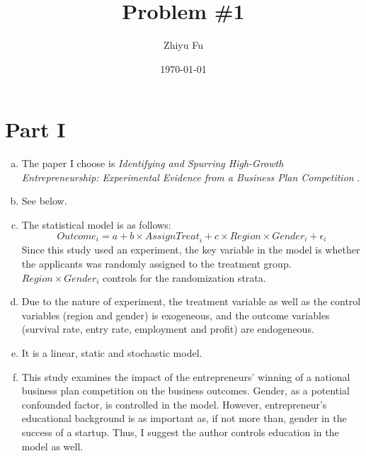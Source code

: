 \documentclass[12pt]{article}%
\begin{document}
\title{Problem \#1}
\author{Zhiyu Fu}
\date{\today}
\maketitle
\section{Part I}
\begin{enumerate}[a)]
	\item The paper I choose is \textit{Identifying and Spurring High-Growth Entrepreneurship: Experimental Evidence from a Business Plan Competition} \citep{McKenzie2017AER}.
	\item See below.
	\item The statistical model is as follows:
	\begin{equation}
	\textit{Outcome}_i = a + b \times \textit{AssignTreat}_i + c \times \textit{Region} \times \textit{Gender}_i + \epsilon_i
	\end{equation}
	Since this study used an experiment, the key variable in the model is whether the applicants was randomly assigned to the treatment group. $\textit{Region} \times \textit{Gender}_i$ controls for the randomization strata.
	\item Due to the nature of experiment, the treatment variable as well as the control variables (region and gender) is exogeneous, and the outcome variables (survival rate, entry rate, employment and profit) are endogeneous.
	\item It is a linear, static and stochastic model.
	\item This study examines the impact of the entrepreneurs' winning of a national business plan competition on the business outcomes. Gender, as a potential confounded factor, is controlled in the model. However, entrepreneur's educational background is as important as, if not more than, gender in the success of a startup. Thus, I suggest the author controls education in the model as well.
\end{enumerate}



\newpage
\end{document}
